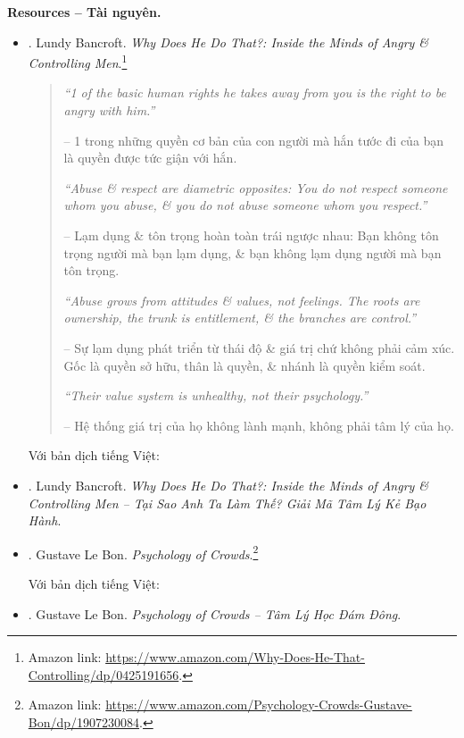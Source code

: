 \documentclass[12pt]{article}
\begin{document}
\noindent\textbf{\textsf{Resources -- Tài nguyên.}}
\begin{itemize}
	\item \cite{Bancroft_why_he_do}. {\sc Lundy Bancroft}. {\it Why Does He Do That?: Inside the Minds of Angry \& Controlling Men}.\footnote{Amazon link: \url{https://www.amazon.com/Why-Does-He-That-Controlling/dp/0425191656}.}
	\begin{quotation}
		{\it``1 of the basic human rights he takes away from you is the right to be angry with him.''}
		
		-- 1 trong những quyền cơ bản của con người mà hắn tước đi của bạn là quyền được tức giận với hắn.
		
		{\it``Abuse \& respect are diametric opposites: You do not respect someone whom you abuse, \& you do not abuse someone whom you respect.''}
		
		-- Lạm dụng \& tôn trọng hoàn toàn trái ngược nhau: Bạn không tôn trọng người mà bạn lạm dụng, \& bạn không lạm dụng người mà bạn tôn trọng.
		
		{\it``Abuse grows from attitudes \& values, not feelings. The roots are ownership, the trunk is entitlement, \& the branches are control.''}
			
		-- Sự lạm dụng phát triển từ thái độ \& giá trị chứ không phải cảm xúc. Gốc là quyền sở hữu, thân là quyền, \& nhánh là quyền kiểm soát.
		
		{\it``Their value system is unhealthy, not their psychology.''}
		
		-- Hệ thống giá trị của họ không lành mạnh, không phải tâm lý của họ.
	\end{quotation}
	Với bản dịch tiếng Việt:
	\item \cite{Bancroft_why_he_do_VN}. {\sc Lundy Bancroft}. {\it Why Does He Do That?: Inside the Minds of Angry \& Controlling Men -- Tại Sao Anh Ta Làm Thế? Giải Mã Tâm Lý Kẻ Bạo Hành}.
	\item \cite{Bon_crowd_psychology}. {\sc Gustave Le Bon}. {\it Psychology of Crowds}.\footnote{Amazon link: \url{https://www.amazon.com/Psychology-Crowds-Gustave-Bon/dp/1907230084}.}
	
	Với bản dịch tiếng Việt:
	\item \cite{Bon_crowd_psychology_VN}. {\sc Gustave Le Bon}. {\it Psychology of Crowds -- Tâm Lý Học Đám Đông}.
\end{itemize}
\end{document}
